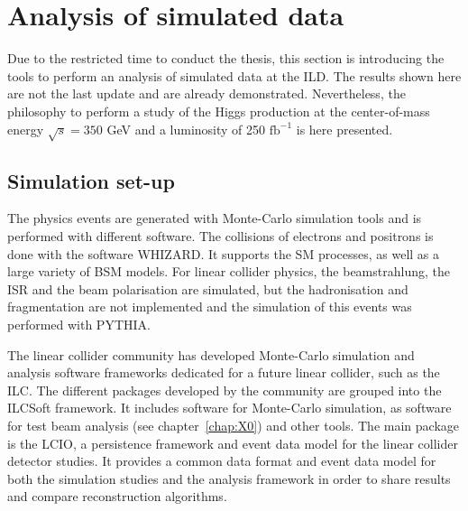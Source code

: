  

  \section{Analysis of simulated data}
  
    Due to the restricted time to conduct the thesis, this section is introducing the tools to perform an analysis of simulated data at the ILD. 
    The results shown here are not the last update and are already demonstrated\cite{Mueller}. 
    Nevertheless, the philosophy to perform a study of the Higgs production at the center-of-mass energy $\sqrt{s} = 350$ GeV and a luminosity of 250 $\text{fb}^{-1}$ is here presented.
  
  \subsection{Simulation set-up}  
  \label{subsec:ILCSOFT}

    The physics events are generated with Monte-Carlo simulation tools and is performed with different software.
    The collisions of electrons and positrons is done with the software WHIZARD\cite{WHIZARD}.
    It supports the \gls{SM} processes, as well as a large variety of BSM models.
    For linear collider physics, the beamstrahlung, the \gls{ISR} and the beam polarisation are simulated, but the hadronisation and fragmentation are not implemented and the simulation of this events was performed with PYTHIA\cite{PYTHIA}.
  
    The linear collider community has developed Monte-Carlo simulation and analysis software frameworks dedicated for a future linear collider, such as the \gls{ILC}. 
    The different packages developed by the community are grouped into the ILCSoft framework\cite{ilcsoft}.
    It includes software for Monte-Carlo simulation, as software for test beam analysis (see chapter~\ref{chap:X0}) and other tools.
    The main package is the \gls{LCIO}, a persistence framework and event data model for the linear collider detector studies\cite{lcio}. 
    It provides a common data format and event data model for both the simulation studies and the analysis framework in order to share results and compare reconstruction algorithms.

